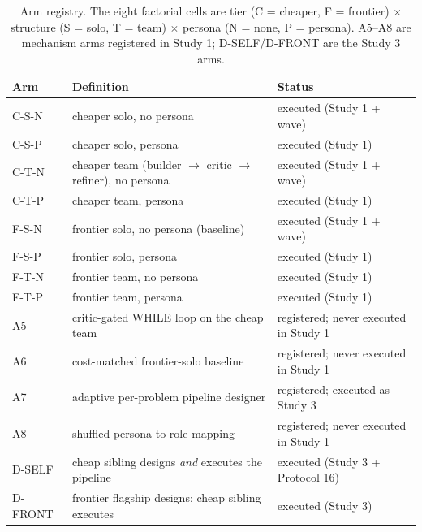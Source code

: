 \documentclass[12pt,a4paper]{article}
\begin{document}
\begin{table}[ht]
  \centering
  \caption{Arm registry. The eight factorial cells are tier (C = cheaper,
  F = frontier) $\times$ structure (S = solo, T = team) $\times$ persona
  (N = none, P = persona). A5--A8 are mechanism arms registered in Study 1;
  D-SELF/D-FRONT are the Study 3 arms.}
  \label{tab:arm-registry}
  \footnotesize
  \begin{tabular}{@{}l l l@{}}
    \toprule
    \textbf{Arm} & \textbf{Definition} & \textbf{Status} \\
    \midrule
    C-S-N & cheaper solo, no persona & executed (Study 1 + wave) \\
    C-S-P & cheaper solo, persona & executed (Study 1) \\
    C-T-N & cheaper team (builder $\to$ critic $\to$ refiner), no persona & executed (Study 1 + wave) \\
    C-T-P & cheaper team, persona & executed (Study 1) \\
    F-S-N & frontier solo, no persona (baseline) & executed (Study 1 + wave) \\
    F-S-P & frontier solo, persona & executed (Study 1) \\
    F-T-N & frontier team, no persona & executed (Study 1) \\
    F-T-P & frontier team, persona & executed (Study 1) \\
    \midrule
    A5 & critic-gated WHILE loop on the cheap team & registered; never executed in Study 1 \\
    A6 & cost-matched frontier-solo baseline & registered; never executed in Study 1 \\
    A7 & adaptive per-problem pipeline designer & registered; executed as Study 3 \\
    A8 & shuffled persona-to-role mapping & registered; never executed in Study 1 \\
    \midrule
    D-SELF & cheap sibling designs \emph{and} executes the pipeline & executed (Study 3 + Protocol 16) \\
    D-FRONT & frontier flagship designs; cheap sibling executes & executed (Study 3) \\
    \bottomrule
  \end{tabular}
\end{table}
\end{document}
